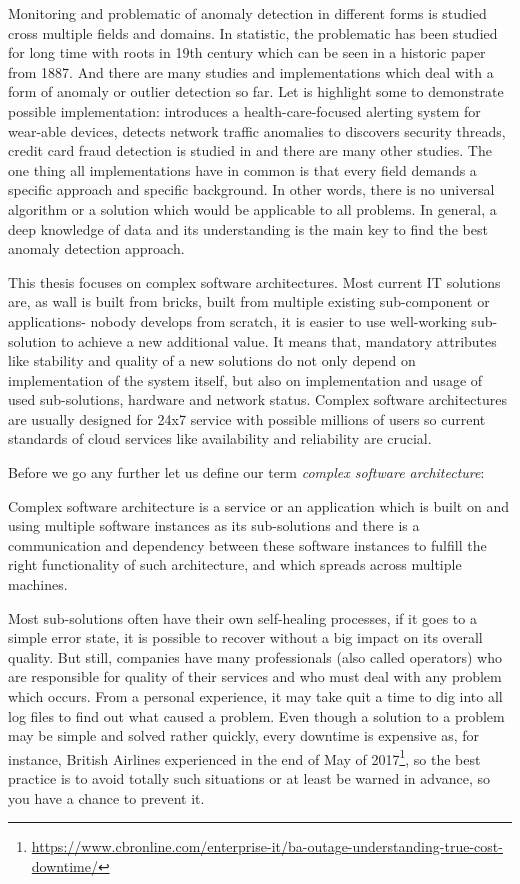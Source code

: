 Monitoring and problematic of anomaly detection in different forms is studied cross multiple fields and domains. In statistic, the problematic has been studied for long time with roots in 19th century which can be seen in a historic paper \cite{edgeworth1887xli} from 1887. And there are many studies and implementations which deal with a form of anomaly or outlier detection so far. Let is highlight some to demonstrate possible implementation: \cite{salem2014online} introduces a health-care-focused alerting system for wear-able devices, \cite{rehak2008trust} detects network traffic anomalies to discovers security threads, credit card fraud detection is studied in \cite{bolton2001unsupervised} and there are many other studies. The one thing all implementations have in common is that every field demands a specific approach and specific background. In other words, there is no universal algorithm or a solution which would be applicable to all problems. In general, a deep knowledge of data and its understanding is the main key to find the best anomaly detection approach.

This thesis focuses on complex software architectures. Most current IT solutions are, as wall is built from bricks, built from multiple existing sub-component or applications- nobody develops from scratch, it is easier to use well-working sub-solution to achieve a new additional value. It means that, mandatory attributes like stability and quality of a new solutions do not only depend on implementation of the system itself, but also on implementation and usage of used sub-solutions, hardware and network status. Complex software architectures are usually designed for 24x7 service with possible millions of users so current standards of cloud services like availability and reliability are crucial.

Before we go any further let us define our term \textit{complex software architecture}:

\begin{definition}\label{def:complexSoftwareArch}Complex software architecture is a service or an application which is built on and using multiple software instances as its sub-solutions and there is a communication and dependency between these software instances to fulfill the right functionality of such architecture, and which spreads across multiple machines. 
\end{definition}

Most sub-solutions often have their own self-healing processes, if it goes to a simple error state, it is possible to recover without a big impact on its overall quality. But still, companies have many professionals (also called operators) who are responsible for quality of their services and who must deal with any problem which occurs. From a personal experience, it may take quit a time to dig into all log files to find out what caused a problem. Even though a solution to a problem may be simple and solved rather quickly, every downtime is expensive as, for instance, British Airlines experienced in the end of May of 2017\footnote{\url{https://www.cbronline.com/enterprise-it/ba-outage-understanding-true-cost-downtime/}}, so the best practice is to avoid totally such situations or at least be warned in advance, so you have a chance to prevent it.

